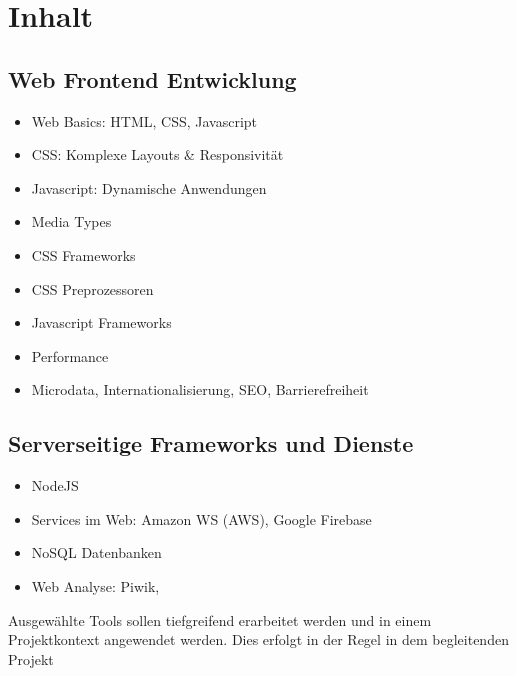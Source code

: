 \section*{Inhalt\label{/mi-2017/modulbeschreibungen-bachelor/BA_Vertiefung-Web_Development}}\label{inhaltpathlabelmi-2017modulbeschreibungen-bachelorbaux5fvertiefung-webux5fdevelopment}

\subsection*{Web Frontend
Entwicklung\label{/mi-2017/modulbeschreibungen-bachelor/BA_Vertiefung-Web_Development}}\label{web-frontend-entwicklungpathlabelmi-2017modulbeschreibungen-bachelorbaux5fvertiefung-webux5fdevelopment-2}

\begin{itemize}
\tightlist
\item
  Web Basics: HTML, CSS, Javascript
\item
  CSS: Komplexe Layouts \& Responsivität
\item
  Javascript: Dynamische Anwendungen
\item
  Media Types
\item
  CSS Frameworks
\item
  CSS Preprozessoren
\item
  Javascript Frameworks
\item
  Performance
\item
  Microdata, Internationalisierung, SEO, Barrierefreiheit
\end{itemize}

\subsection*{Serverseitige Frameworks und
Dienste\label{/mi-2017/modulbeschreibungen-bachelor/BA_Vertiefung-Web_Development}}\label{serverseitige-frameworks-und-dienstepathlabelmi-2017modulbeschreibungen-bachelorbaux5fvertiefung-webux5fdevelopment-2}

\begin{itemize}
\tightlist
\item
  NodeJS
\item
  Services im Web: Amazon WS (AWS), Google Firebase
\item
  NoSQL Datenbanken
\item
  Web Analyse: Piwik,
\end{itemize}

Ausgewählte Tools sollen tiefgreifend erarbeitet werden und in einem
Projektkontext angewendet werden. Dies erfolgt in der Regel in dem
begleitenden Projekt


